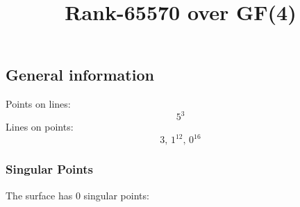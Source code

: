 \documentclass{article}
\newcommand\setTBstruts{\def\T{\rule{0pt}{2.6ex}}%
\def\B{\rule[-1.2ex]{0pt}{0pt}}}
\begin{document}
 
\setTBstruts



{\allowdisplaybreaks%






\title{Rank-65570 over GF(4)}
\author{}%
\maketitle%
%
{}



\subsection*{General information}
Points on lines:
$$
5^3$$
Lines on points:
$$
3,\,1^{12},\,0^{16}$$
\subsubsection*{Singular Points}
The surface has 0 singular points:\\
\begin{align*}
\end{align*}
}
\end{document}
